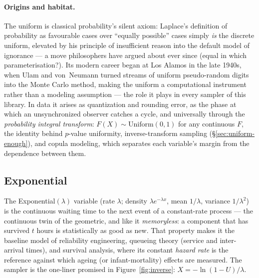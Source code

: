 \documentclass[11pt]{article}
\numberwithin{equation}{section}
\newcommand{\srcref}[1]{%
  \par\smallskip\noindent{\small\sffamily\color{inkS}\raggedright
  $\hookrightarrow$ implemented in \texttt{#1}\par}\smallskip}
\begin{document}
\paragraph{Origins and habitat.}
The uniform is classical probability's silent axiom: Laplace's definition
of probability as favourable cases over ``equally possible'' cases
\citep{laplace1812} simply \emph{is} the discrete uniform, elevated by his
principle of insufficient reason into the default model of ignorance ---
a move philosophers have argued about ever since (equal in which
parameterisation?).  Its modern career began at Los Alamos in the late
1940s, when Ulam and von~Neumann turned streams of uniform pseudo-random
digits into the Monte Carlo method, making the uniform a computational
instrument rather than a modeling assumption --- the role it plays in
every sampler of this library.  In data it arises as quantization and
rounding error, as the phase at which an unsynchronized observer catches a
cycle, and universally through the \emph{probability integral transform}:
$F(X)\sim\mathrm{Uniform}(0,1)$ for any continuous $F$, the identity
behind $p$-value uniformity, inverse-transform sampling
(\S\ref{sec:uniform-enough}), and copula modeling, which separates each
variable's margin from the dependence between them.

\srcref{src/dist.c: ps\_uniform()}

\subsection{Exponential}\label{sec:exponential}

The Exponential$(\lambda)$ variable (rate $\lambda$; density
$\lambda e^{-\lambda x}$, mean $1/\lambda$, variance $1/\lambda^2$) is the
continuous waiting time to the next event of a constant-rate process ---
the continuous twin of the geometric, and like it \emph{memoryless}: a
component that has survived $t$ hours is statistically as good as new.
That property makes it the baseline model of reliability engineering,
queueing theory (service and inter-arrival times), and survival analysis,
where its constant \emph{hazard rate} is the reference against which
ageing (or infant-mortality) effects are measured.  The sampler is the
one-liner promised in Figure~\ref{fig:inverse}:
$X=-\ln(1-U)/\lambda$.
\end{document}
